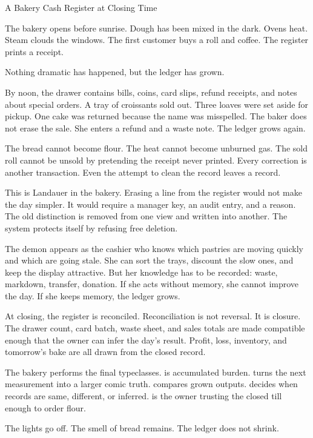 \begin{coda}{A Bakery Cash Register at Closing Time}

The bakery opens before sunrise. Dough has been mixed in the dark. Ovens heat.
Steam clouds the windows. The first customer buys a roll and coffee. The
register prints a receipt.

Nothing dramatic has happened, but the ledger has grown.

By noon, the drawer contains bills, coins, card slips, refund receipts, and
notes about special orders. A tray of croissants sold out. Three loaves were
set aside for pickup. One cake was returned because the name was misspelled.
The baker does not erase the sale. She enters a refund and a waste note. The
ledger grows again.

The bread cannot become flour. The heat cannot become unburned gas. The sold
roll cannot be unsold by pretending the receipt never printed. Every correction
is another transaction. Even the attempt to clean the record leaves a record.

This is Landauer in the bakery. Erasing a line from the register would not make
the day simpler. It would require a manager key, an audit entry, and a reason.
The old distinction is removed from one view and written into another. The
system protects itself by refusing free deletion.

The demon appears as the cashier who knows which pastries are moving quickly
and which are going stale. She can sort the trays, discount the slow ones, and
keep the display attractive. But her knowledge has to be recorded: waste,
markdown, transfer, donation. If she acts without memory, she cannot improve
the day. If she keeps memory, the ledger grows.

At closing, the register is reconciled. Reconciliation is not reversal. It is
closure. The drawer count, card batch, waste sheet, and sales totals are made
compatible enough that the owner can infer the day's result. Profit, loss,
inventory, and tomorrow's bake are all drawn from the closed record.

The bakery performs the final typeclasses.  is accumulated
burden.  turns the next measurement into a larger comic
truth.  compares grown outputs.  decides when
records are same, different, or inferred.  is the owner trusting
the closed till enough to order flour.

The lights go off. The smell of bread remains. The ledger does not shrink.

\end{coda}
